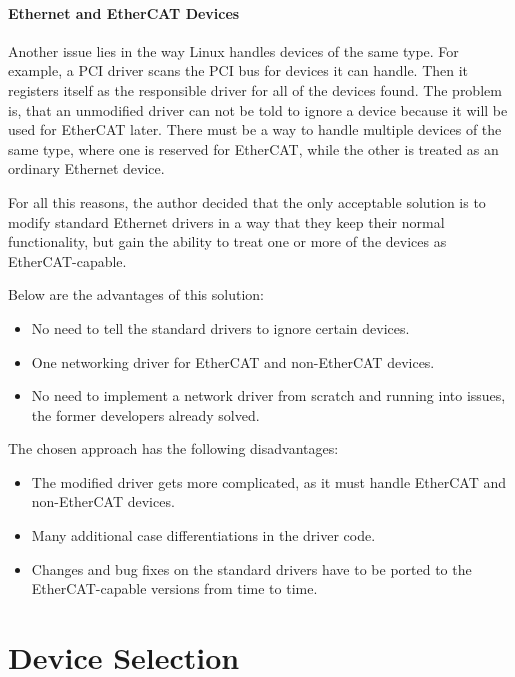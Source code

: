 \documentclass[a4paper,12pt,BCOR6mm,bibtotoc,idxtotoc]{scrbook}
\begin{document}
\paragraph{Ethernet and EtherCAT Devices}

Another issue lies in the way Linux handles devices of the same type.  For
example, a PCI driver scans the PCI bus for devices it can handle. Then it registers
itself as the responsible driver for all of the devices found. The problem is,
that an unmodified driver can not be told to ignore a device because it will
be used for EtherCAT later. There must be a way to handle multiple devices of
the same type, where one is reserved for EtherCAT, while the other is treated
as an ordinary Ethernet device.

For all this reasons, the author decided that the only acceptable solution is
to modify standard Ethernet drivers in a way that they keep their normal
functionality, but gain the ability to treat one or more of the devices as
EtherCAT-capable.

Below are the advantages of this solution:

\begin{itemize}
\item No need to tell the standard drivers to ignore certain devices.
\item One networking driver for EtherCAT and non-EtherCAT devices.
\item No need to implement a network driver from scratch and running
  into issues, the former developers already solved.
\end{itemize}

The chosen approach has the following disadvantages:

\begin{itemize}
\item The modified driver gets more complicated, as it must handle
  EtherCAT and non-EtherCAT devices.
\item Many additional case differentiations in the driver code.
\item Changes and bug fixes on the standard drivers have to be ported
  to the Ether\-CAT-capable versions from time to time.
\end{itemize}


\section{Device Selection}
\label{sec:deviceselection}
\end{document}
